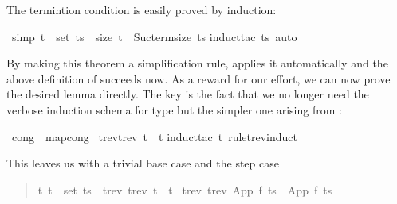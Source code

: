 \begin{isabelle}%
%
\begin{isamarkuptext}%
\noindent
The termintion condition is easily proved by induction:%
\end{isamarkuptext}%
\ {\isacharbrackleft}simp{\isacharbrackright}{\isacharcolon}\ {\isachardoublequote}t\ {\isasymin}\ set\ ts\ {\isasymlongrightarrow}\ size\ t\ {\isacharless}\ Suc{\isacharparenleft}term{\isacharunderscore}size\ ts{\isacharparenright}{\isachardoublequote}\isanewline
{}induct{\isacharunderscore}tac\ ts{\isacharcomma}\ auto{\isacharparenright}%
\begin{isamarkuptext}%
\noindent
By making this theorem a simplification rule, 
applies it automatically and the above definition of 
succeeds now. As a reward for our effort, we can now prove the desired
lemma directly. The key is the fact that we no longer need the verbose
induction schema for type  but the simpler one arising from
:%
\end{isamarkuptext}%
\ {\isacharbrackleft}cong{\isacharbrackright}\ {\isacharequal}\ map{\isacharunderscore}cong\isanewline
{}\ {\isachardoublequote}trev{\isacharparenleft}trev\ t{\isacharparenright}\ {\isacharequal}\ t{\isachardoublequote}\isanewline
{}induct{\isacharunderscore}tac\ t\ rule{\isacharcolon}trev{\isachardot}induct{\isacharparenright}%
\begin{isamarkuptxt}%
\noindent
This leaves us with a trivial base case  and the step case
\begin{quote}

\begin{isabelle}%
{\isasymforall}\mbox{t}{\isachardot}\ \mbox{t}\ {\isasymin}\ set\ \mbox{ts}\ {\isasymlongrightarrow}\ trev\ {\isacharparenleft}trev\ \mbox{t}{\isacharparenright}\ {\isacharequal}\ \mbox{t}\ {\isasymLongrightarrow}\isanewline
trev\ {\isacharparenleft}trev\ {\isacharparenleft}App\ \mbox{f}\ \mbox{ts}{\isacharparenright}{\isacharparenright}\ {\isacharequal}\ App\ \mbox{f}\ \mbox{ts}
\end{isabelle}%


\end{quote}
\end{isamarkuptxt}
\end{isabelle}

